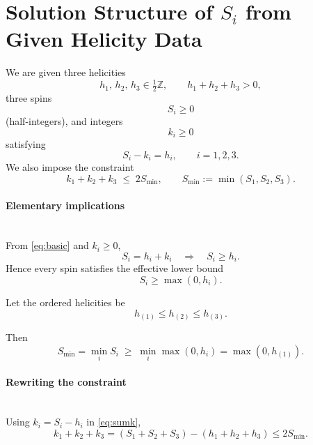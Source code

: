 \documentclass[12pt]{article}
\begin{document}
\section{Solution Structure of $S_i$ from Given Helicity Data}

We are given three helicities
\begin{equation}
h_1,\,h_2,\,h_3\in \tfrac12\mathbb Z,
\qquad 
h_1+h_2+h_3>0,
\end{equation}
three spins $$S_i\ge0$$ (half-integers), and integers $$k_i\ge0$$ satisfying
\begin{equation}\label{eq:basic}
S_i - k_i = h_i ,\qquad i=1,2,3.
\end{equation}
We also impose the constraint
\begin{equation}\label{eq:sumk}
k_1 + k_2 + k_3 \;\le\; 2 S_{\min},
\qquad 
S_{\min}:=\min(S_1,S_2,S_3).
\end{equation}

\paragraph{Elementary implications}\leavevmode\\

From \eqref{eq:basic} and $k_i\ge0$,
\begin{equation}
S_i = h_i + k_i \quad\Rightarrow\quad S_i \ge h_i.
\end{equation}
Hence every spin satisfies the effective lower bound
\begin{equation}\label{eq:Si-lower}
S_i \ge \max(0,h_i).
\end{equation}

Let the ordered helicities be 
\begin{equation}
   h_{(1)}\le h_{(2)}\le h_{(3)}.
\end{equation}

Then
\begin{equation}\label{eq:Smin-lower}
S_{\min}
= \min_{i} S_i
\;\ge\;
\min_{i}\max(0,h_i)
=
\max(0,h_{(1)}).
\end{equation}



\paragraph{Rewriting the constraint}\leavevmode\\

Using $k_i=S_i-h_i$ in \eqref{eq:sumk},
\begin{equation}
k_1+k_2+k_3
= (S_1+S_2+S_3)-(h_1+h_2+h_3)
\le 2 S_{\min}.
\end{equation}
\end{document}
